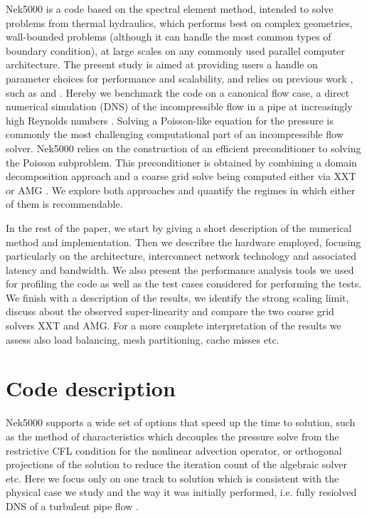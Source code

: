 \documentclass{sig-alternate}
\begin{document}
Nek5000 is a code based on the spectral element method, intended to solve problems
from thermal hydraulics, which performs best on
complex geometries, wall-bounded problems (although it can handle the most common types of
boundary condition), at large scales on any commonly used parallel computer
architecture. The present study is aimed at providing users a handle on
parameter choices for performance and scalability, and relies on previous work ,
such as \cite{fischer:scaling} and \cite{tufo:terascale}. Hereby we benchmark
the code on a canonical flow case, a direct numerical simulation (DNS) of the
incompressible flow in a pipe at increasingly high Reynolds numbers
\cite{Khoury2013}. Solving a Poisson-like equation for the
pressure is commonly the most challenging computational part of an incompressible flow
solver. Nek5000 relies on the construction of an efficient preconditioner to solving the Poisson
subproblem. This preconditioner is obtained by combining a domain decomposition 
approach and a coarse grid solve being computed either via XXT \cite{Tufo2001151} 
or AMG \cite{LottesAMG}. We explore both 
approaches and quantify the regimes in which either of them is recommendable. 

In the rest of the paper, we start by giving a short description of the numerical method
and implementation. Then we describre the hardware employed, focusing particularly on
the architecture, interconnect network technology and associated latency and
bandwidth. We also present the performance analysis tools we used for profiling the code
as well as the test cases considered for performing the tests. We finish with a 
description of the results, we identify the strong scaling limit, discuss about the
observed super-linearity and compare the two coarse grid solvers XXT and AMG. For 
a more complete interpretation of the results we assess also load balancing, 
mesh partitioning, cache misses etc. 


\section{Code description}
Nek5000 supports a wide set of options that speed up the time to solution, such
as the method of characteristics which decouples the pressure solve from the
restrictive CFL condition for the nonlinear advection operator, or orthogonal
projections of the solution to reduce the iteration count of the algebraic
solver etc. Here we focus only on one track to solution which is consistent with
the physical case we study and the way it was initially performed, i.e. fully 
resiolved DNS of a turbulent pipe flow \cite{Khoury2013}.
\end{document}
